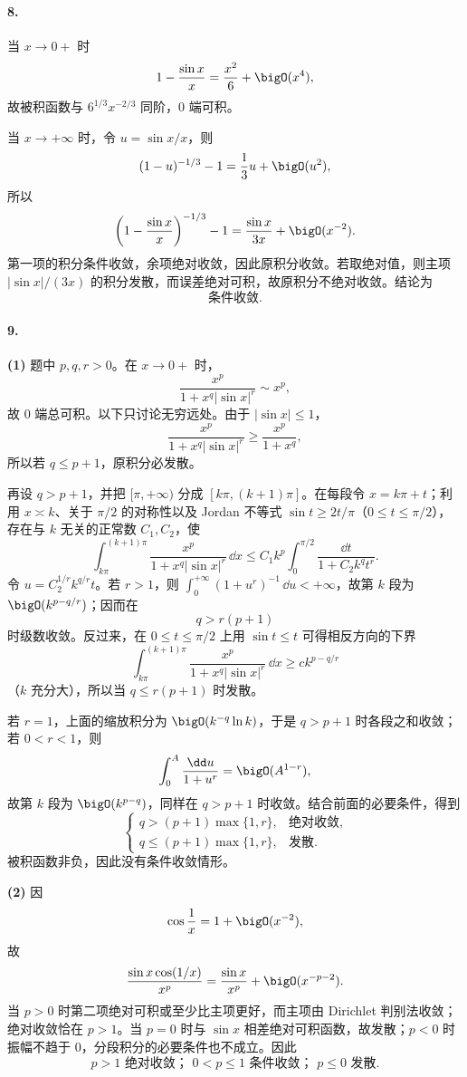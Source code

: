 \paragraph{8.}
当 $x\to0+$ 时
\[
  1-\frac{\sin x}{x}=\frac{x^2}{6}+\bigO(x^4),
\]
故被积函数与 $6^{1/3}x^{-2/3}$ 同阶，$0$ 端可积。

当 $x\to+\infty$ 时，令 $u=\sin x/x$，则
\[
  (1-u)^{-1/3}-1=\frac13u+\bigO(u^2),
\]
所以
\[
  \left(1-\frac{\sin x}{x}\right)^{-1/3}-1
  =\frac{\sin x}{3x}+\bigO(x^{-2}).
\]
第一项的积分条件收敛，余项绝对收敛，因此原积分收敛。若取绝对值，则主项 $|\sin x|/(3x)$ 的积分发散，而误差绝对可积，故原积分不绝对收敛。结论为
\[
  \boxed{\text{条件收敛}}.
\]

\paragraph{9.}
\textbf{(1)} 题中 $p,q,r>0$。在 $x\to0+$ 时，
\[
  \frac{x^p}{1+x^q|\sin x|^r}\sim x^p,
\]
故 $0$ 端总可积。以下只讨论无穷远处。由于 $|\sin x|\leq1$，
\[
  \frac{x^p}{1+x^q|\sin x|^r}\geq\frac{x^p}{1+x^q},
\]
所以若 $q\leq p+1$，原积分必发散。

再设 $q>p+1$，并把 $[\pi,+\infty)$ 分成 $[k\pi,(k+1)\pi]$。在每段令 $x=k\pi+t$；利用 $x\asymp k$、关于 $\pi/2$ 的对称性以及 Jordan 不等式 $\sin t\geq2t/\pi$（$0\leq t\leq\pi/2$），存在与 $k$ 无关的正常数 $C_1,C_2$，使
\[
  \int_{k\pi}^{(k+1)\pi}\frac{x^p}{1+x^q|\sin x|^r}\,\dd x
  \leq C_1 k^p\int_0^{\pi/2}\frac{\dd t}{1+C_2k^q t^r}.
\]
令 $u=C_2^{1/r}k^{q/r}t$。若 $r>1$，则 $\int_0^{+\infty}(1+u^r)^{-1}\,\dd u<+\infty$，故第 $k$ 段为 $\bigO(k^{p-q/r})$；因而在
\[
  q>r(p+1)
\]
时级数收敛。反过来，在 $0\leq t\leq\pi/2$ 上用 $\sin t\leq t$ 可得相反方向的下界
\[
  \int_{k\pi}^{(k+1)\pi}\frac{x^p}{1+x^q|\sin x|^r}\,\dd x
  \geq c k^{p-q/r}
\]
（$k$ 充分大），所以当 $q\leq r(p+1)$ 时发散。

若 $r=1$，上面的缩放积分为 $\bigO(k^{-q}\ln k)$，于是 $q>p+1$ 时各段之和收敛；若 $0<r<1$，则
\[
  \int_0^A\frac{\dd u}{1+u^r}=\bigO(A^{1-r}),
\]
故第 $k$ 段为 $\bigO(k^{p-q})$，同样在 $q>p+1$ 时收敛。结合前面的必要条件，得到
\[
  \boxed{
  \begin{cases}
    q>(p+1)\max\{1,r\},&\text{绝对收敛},\\
    q\leq(p+1)\max\{1,r\},&\text{发散}.
  \end{cases}}
\]
被积函数非负，因此没有条件收敛情形。

\textbf{(2)} 因
\[
  \cos\frac1x=1+\bigO(x^{-2}),
\]
故
\[
  \frac{\sin x\cos(1/x)}{x^p}
  =\frac{\sin x}{x^p}+\bigO(x^{-p-2}).
\]
当 $p>0$ 时第二项绝对可积或至少比主项更好，而主项由 Dirichlet 判别法收敛；绝对收敛恰在 $p>1$。当 $p=0$ 时与 $\sin x$ 相差绝对可积函数，故发散；$p<0$ 时振幅不趋于 $0$，分段积分的必要条件也不成立。因此
\[
  \boxed{p>1\text{ 绝对收敛； }0<p\leq1\text{ 条件收敛； }p\leq0\text{ 发散}.}
\]

